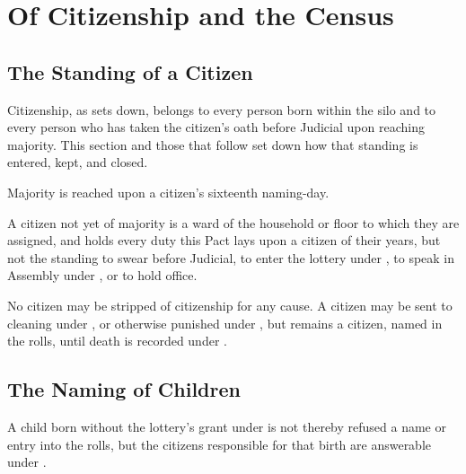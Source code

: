 \chapter{Of Citizenship and the Census}
\label{art:citizenship}


\section{The Standing of a Citizen}
\label{sec:citizenship:standing-of-a-citizen}

Citizenship, as  sets down, belongs to every person born within the silo and to every person who has taken the citizen's oath before Judicial upon reaching majority. This section and those that follow set down how that standing is entered, kept, and closed.

\begin{clauses}
\item Majority is reached upon a citizen's sixteenth naming-day.
\item A citizen not yet of majority is a ward of the household or floor to which they are assigned, and holds every duty this Pact lays upon a citizen of their years, but not the standing to swear before Judicial, to enter the lottery under , to speak in Assembly under , or to hold office.
\item No citizen may be stripped of citizenship for any cause. A citizen may be sent to cleaning under , or otherwise punished under , but remains a citizen, named in the rolls, until death is recorded under .
\end{clauses}

\section{The Naming of Children}
\label{sec:citizenship:naming-of-children}

A child born without the lottery's grant under  is not thereby refused a name or entry into the rolls, but the citizens responsible for that birth are answerable under .

